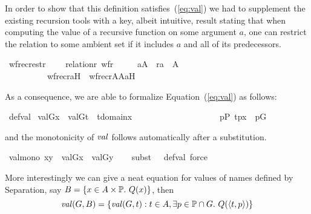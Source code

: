 In order to show that this definition satisfies~(\ref{eq:val}) we had
to supplement the existing recursion tools with a key, albeit
intuitive, result stating that when computing the value of a recursive 
function on some argument $a$, one can restrict the relation to some
ambient set if it includes $a$ and all of its predecessors.
\begin{isabelle}
\isamarkupfalse%
\ wfrec{\isacharunderscore}restr\ {\isacharcolon}\isanewline
\ \ \ {\isachardoublequoteopen}relation{\isacharparenleft}r{\isacharparenright}{\isachardoublequoteclose}\ {\isachardoublequoteopen}wf{\isacharparenleft}r{\isacharparenright}{\isachardoublequoteclose}\ \isanewline
\ \ \ \ {\isachardoublequoteopen}a{\isasymin}A\ {\isasymLongrightarrow}\ {\isacharparenleft}r{\isacharcircum}{\isacharplus}{\isacharparenright}{\isacharminus}{\isacharbackquote}{\isacharbackquote}{\isacharbraceleft}a{\isacharbraceright}\ {\isasymsubseteq}\ A\ {\isasymLongrightarrow}\ \isanewline
\ \ \ \ \ \ \ \ \ \ wfrec{\isacharparenleft}r{\isacharcomma}a{\isacharcomma}H{\isacharparenright}\ {\isacharequal}\ wfrec{\isacharparenleft}r{\isasyminter}A{\isasymtimes}A{\isacharcomma}a{\isacharcomma}H{\isacharparenright}{\isachardoublequoteclose}
\end{isabelle}
As a consequence, we are able to formalize Equation~(\ref{eq:val}) as follows:
\begin{isabelle}
  \isamarkupfalse%
  \ def{\isacharunderscore}val{\isacharcolon}\isanewline
  \ {\isachardoublequoteopen}val{\isacharparenleft}G{\isacharcomma}x{\isacharparenright}\ {\isacharequal}\ {\isacharbraceleft}val{\isacharparenleft}G{\isacharcomma}t{\isacharparenright}\ {\isachardot}{\isachardot}\ t{\isasymin}domain{\isacharparenleft}x{\isacharparenright}\ {\isacharcomma}\isanewline
\ \ \ \ \ \ \ \ \ \ \ \ \ \ \ \ \ \ \ {\isasymexists}p{\isasymin}P{\isachardot}\ {\isacharless}t{\isacharcomma}p{\isachargreater}{\isasymin}x\ {\isasymand}\ p{\isasymin}G\ {\isacharbraceright}{\isachardoublequoteclose}
\end{isabelle}
and the monotonicity of $\operatorname{\mathit{val}}$ follows automatically after a
substitution.
\begin{isabelle}
\isamarkupfalse%
\ val{\isacharunderscore}mono{\isacharcolon}\ {\isachardoublequoteopen}x{\isasymsubseteq}y\ {\isasymLongrightarrow}\ val{\isacharparenleft}G{\isacharcomma}x{\isacharparenright}\ {\isasymsubseteq}\ val{\isacharparenleft}G{\isacharcomma}y{\isacharparenright}{\isachardoublequoteclose}\isanewline
%
\ \ \isamarkupfalse%
\ {\isacharparenleft}subst\ {\isacharparenleft}{}\ {}{\isacharparenright}\ def{\isacharunderscore}val{\isacharcomma}\ force{\isacharparenright}%
\end{isabelle}
More interestingly we can give a neat equation for values of
names defined by Separation, say $B = \{x\in A\times \mathbb{P}.\ Q(x)\}$,
then
\begin{equation}
\val(G,B) = \{\val(G,t) : t\in A , \exists p\in \PP \cap G.\ Q(\lb t,p\rb) \} \label{eq:val-name-sep}
\end{equation}

